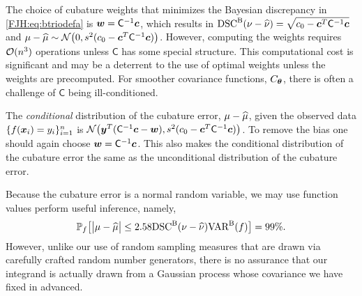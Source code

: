 \documentclass[graybox,footinfo]{svmult}
\begin{document}
The choice of cubature weights that 
minimizes the Bayesian discrepancy in \eqref{FJH:eq:btriodefa} is ${\boldsymbol{w}} = 
\mathsf{C}^{-1} {\boldsymbol{c}}$, which results in $\textup{DSC}^{\textup{B}}(\nu - \widehat{\nu}) = \sqrt{c_0 - {\boldsymbol{c}} ^T 
\mathsf{C}^{-1} {\boldsymbol{c}}}$ and $\mu - \widehat{\mu} \sim {\mathcal{N}} \bigl(0 , s^2(c_0 - {\boldsymbol{c}} ^T 
\mathsf{C}^{-1} {\boldsymbol{c}}) \bigr)$.  However, computing the weights requires ${\mathcal{O}}(n^3)$ 
operations 
unless $\mathsf{C}$ has some special structure.  This computational cost is significant 
and may be a deterrent to the use of optimal weights unless the weights are 
precomputed. For smoother covariance functions, $C_{\boldsymbol{\theta}}$, there is often a 
challenge of $\mathsf{C}$ being ill-conditioned.

The \emph{conditional} distribution of the cubature error, $\mu - \widehat{\mu}$, given the 
observed data $ \{f({\boldsymbol{x}}_i )= y_i\}_{i=1}^n$ is ${\mathcal{N}} \bigl( {\boldsymbol{y}}^T (\mathsf{C}^{-1}{\boldsymbol{c}} - 
{\boldsymbol{w}}) , s^2(c_0 - {\boldsymbol{c}} ^T \mathsf{C}^{-1} {\boldsymbol{c}}) \bigr)$.  To remove the bias one should again 
choose ${\boldsymbol{w}} = \mathsf{C}^{-1} {\boldsymbol{c}}$.  This also makes the conditional distribution of 
the cubature error the same as the unconditional distribution of the cubature error.

Because the cubature error is a normal random variable, we may use function 
values perform useful inference, namely, 
\begin{equation} \label{FJH:eq:MLEBdOne}
\bbP_f\bigl[\abs{\mu - \hmu} \le 2.58 
\disc^{\Ba}(\nu - \hnu) \Var^{\Ba}(f)\bigr] = 99\%.
\end{equation}
However, unlike our use of random sampling measures that are drawn via carefully 
crafted random number generators, there is no assurance that our integrand is actually 
drawn from a Gaussian process whose covariance we have fixed in advanced.  
\end{document}
